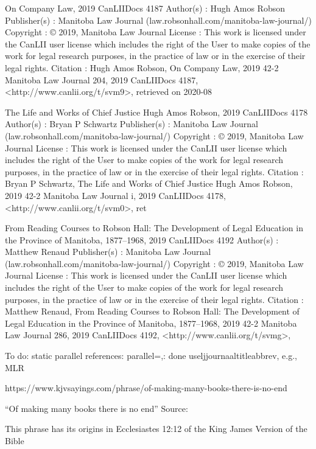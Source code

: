 On Company Law, 2019 CanLIIDocs 4187
Author(s) : 	Hugh Amos Robson
Publisher(s) : 	Manitoba Law Journal (law.robsonhall.com/manitoba-law-journal/)
Copyright : 	© 2019, Manitoba Law Journal
License : 	This work is licensed under the CanLII user license which includes the right of the User to make copies of the work for legal research purposes, in the practice of law or in the exercise of their legal rights.
Citation : 	Hugh Amos Robson, On Company Law, 2019 42-2 Manitoba Law Journal 204, 2019 CanLIIDocs 4187, <http://www.canlii.org/t/svm9>, retrieved on 2020-08


The Life and Works of Chief Justice Hugh Amos Robson, 2019 CanLIIDocs 4178
Author(s) : 	Bryan P Schwartz
Publisher(s) : 	Manitoba Law Journal (law.robsonhall.com/manitoba-law-journal/)
Copyright : 	© 2019, Manitoba Law Journal
License : 	This work is licensed under the CanLII user license which includes the right of the User to make copies of the work for legal research purposes, in the practice of law or in the exercise of their legal rights.
Citation : 	Bryan P Schwartz, The Life and Works of Chief Justice Hugh Amos Robson, 2019 42-2 Manitoba Law Journal i, 2019 CanLIIDocs 4178, <http://www.canlii.org/t/svm0>, ret


From Reading Courses to Robson Hall: The Development of Legal Education in the Province of Manitoba, 1877–1968, 2019 CanLIIDocs 4192
Author(s) : 	Matthew Renaud
Publisher(s) : 	Manitoba Law Journal (law.robsonhall.com/manitoba-law-journal/)
Copyright : 	© 2019, Manitoba Law Journal
License : 	This work is licensed under the CanLII user license which includes the right of the User to make copies of the work for legal research purposes, in the practice of law or in the exercise of their legal rights.
Citation : 	Matthew Renaud, From Reading Courses to Robson Hall: The Development of Legal Education in the Province of Manitoba, 1877–1968, 2019 42-2 Manitoba Law Journal 286, 2019 CanLIIDocs 4192, <http://www.canlii.org/t/svmg>,




To do:
static parallel references: parallel={},: done
useljjournaaltitleabbrev, e.g., MLR


https://www.kjvsayings.com/phrase/of-making-many-books-there-is-no-end

“Of making many books there is no end”
Source:

This phrase has its origins in Ecclesiastes 12:12 of the King James Version of the Bible

